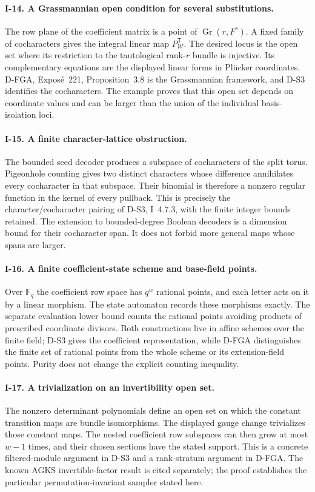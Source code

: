\documentclass[11pt,a4paper]{article}
\theoremstyle{definition}\newtheorem{definition}{Definition}
\begin{document}
\paragraph{I-14. A Grassmannian open condition for several substitutions.}
The row plane of the coefficient matrix is a point of $\operatorname{Gr}(r,F^s)$. A fixed family of cocharacters gives the integral linear map $P_{\mathcal W}^{\mathsf T}$. The desired locus is the open set where its restriction to the tautological rank-$r$ bundle is injective. Its complementary equations are the displayed linear forms in Pl\"ucker coordinates. D-FGA, Expos\'e~221, Proposition~3.8 is the Grassmannian framework, and D-S3 identifies the cocharacters. The example proves that this open set depends on coordinate values and can be larger than the union of the individual basis-isolation loci.

\paragraph{I-15. A finite character-lattice obstruction.}
The bounded seed decoder produces a subspace of cocharacters of the split torus. Pigeonhole counting gives two distinct characters whose difference annihilates every cocharacter in that subspace. Their binomial is therefore a nonzero regular function in the kernel of every pullback. This is precisely the character/cocharacter pairing of D-S3, I~4.7.3, with the finite integer bounds retained. The extension to bounded-degree Boolean decoders is a dimension bound for their cocharacter span. It does not forbid more general maps whose spans are larger.

\paragraph{I-16. A finite coefficient-state scheme and base-field points.}
Over $\mathbb F_q$ the coefficient row space has $q^w$ rational points, and each letter acts on it by a linear morphism. The state automaton records these morphisms exactly. The separate evaluation lower bound counts the rational points avoiding products of prescribed coordinate divisors. Both constructions live in affine schemes over the finite field; D-S3 gives the coefficient representation, while D-FGA distinguishes the finite set of rational points from the whole scheme or its extension-field points. Purity does not change the explicit counting inequality.

\paragraph{I-17. A trivialization on an invertibility open set.}
The nonzero determinant polynomials define an open set on which the constant transition maps are bundle isomorphisms. The displayed gauge change trivializes those constant maps. The nested coefficient row subspaces can then grow at most $w-1$ times, and their chosen sections have the stated support. This is a concrete filtered-module argument in D-S3 and a rank-stratum argument in D-FGA. The known AGKS invertible-factor result is cited separately; the proof establishes the particular permutation-invariant sampler stated here.
\end{document}
